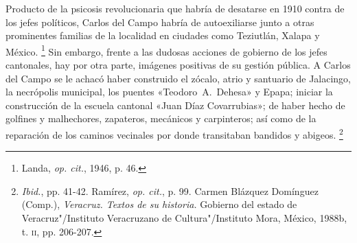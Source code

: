 \documentclass[14pt,twoside,final]{extbook} %
\let\oldfootnote\footnote
\renewcommand\footnote[1]{%
\oldfootnote{\hspace{1mm}#1}}
\begin{document}
Producto de la psicosis revolucionaria que habría de desatarse en 1910 contra de los jefes políticos, Carlos del Campo habría de autoexiliarse junto a otras prominentes familias de la localidad en ciudades como Teziutlán, Xalapa y México.\footnote{Landa, \emph{op. cit.}, 1946, p. 46.} Sin embargo, frente a las dudosas acciones de gobierno de los jefes cantonales, hay por otra parte, imágenes positivas de su gestión pública. A Carlos del Campo se le achacó haber construido el zócalo, atrio y santuario de Jalacingo, la necrópolis municipal, los puentes «\mbox{Teodoro A. Dehesa}» y Epapa; iniciar la construcción de la escuela cantonal «Juan Díaz Covarrubias»; de haber hecho de golfines y malhechores, zapateros, mecánicos y carpinteros; así como de la reparación de los caminos vecinales por donde transitaban bandidos y abigeos.\footnote{\emph{Ibid.}, pp. 41-42. Ramírez, \emph{op. cit.}, p. 99. Carmen Blázquez Domínguez (Comp.), \emph{Veracruz. Textos de su historia.} Gobierno del estado de Veracruz"/Instituto Veracruzano de Cultura"/Instituto Mora, México, 1988b, t. \textsc{ii}, pp. 206-207.} \pagebreak[4]
\end{document}

